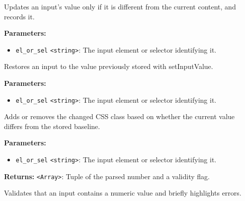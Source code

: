 \documentclass[12pt,a4paper]{article}
\begin{document}
\noindent Updates an input’s value only if it is different from the current content, and records it.

\vspace{5mm}
\noindent {}


\noindent \textbf{Parameters:}
\begin{itemize}
  \item \texttt{el\_or\_sel} \texttt{<string>}: The input element or selector identifying it.
\end{itemize}

\noindent Restores an input to the value previously stored with \textasciigrave{}setInputValue\textasciigrave{}.

\vspace{5mm}
\noindent {}


\noindent \textbf{Parameters:}
\begin{itemize}
  \item \texttt{el\_or\_sel} \texttt{<string>}: The input element or selector identifying it.
\end{itemize}

\noindent Adds or removes the \textasciigrave{}changed\textasciigrave{} CSS class based on whether the current value differs from the stored baseline.

\vspace{5mm}
\noindent {}


\noindent \textbf{Parameters:}
\begin{itemize}
  \item \texttt{el\_or\_sel} \texttt{<string>}: The input element or selector identifying it.
\end{itemize}

\noindent \textbf{Returns:} \texttt{<Array>}: Tuple of the parsed number and a validity flag.

\noindent Validates that an input contains a numeric value and briefly highlights errors.

\vspace{5mm}
\noindent {}
\end{document}
